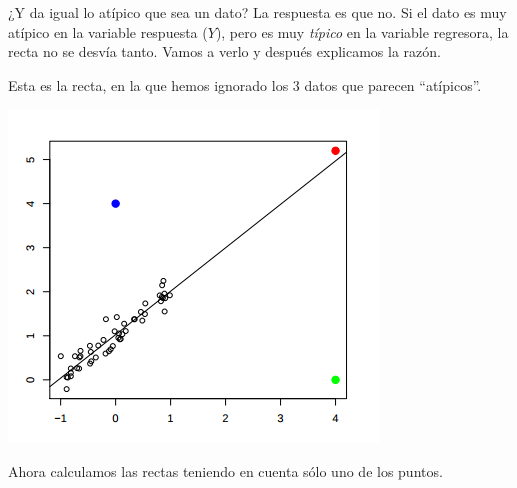 \begin{example}

¿Y da igual lo atípico que sea un dato? La respuesta es que no. Si el dato es muy atípico en la variable respuesta ($Y$), pero es muy \textit{típico} en la variable regresora, la recta no se desvía tanto. Vamos a verlo y después explicamos la razón.

Esta es la recta, en la que hemos ignorado los 3 datos que parecen ``atípicos''.
\begin{center}
\includegraphics[scale=0.9]{img/sobredistanciahorizontal.png}
\end{center}

Ahora calculamos las rectas teniendo en cuenta sólo uno de los puntos.


\end{example}
